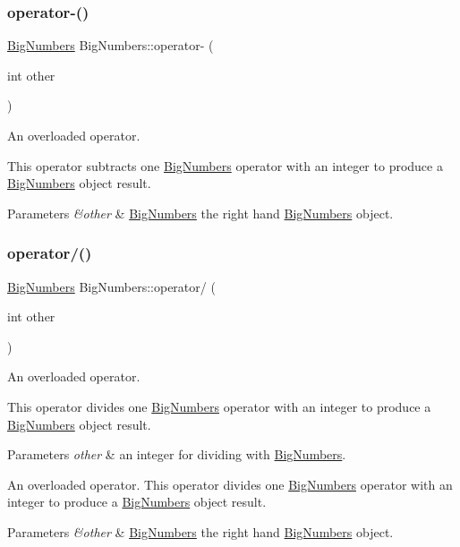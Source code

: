 \subsubsection{\texorpdfstring{operator-\/()}{operator-()}\hspace{0.1cm}{\footnotesize\ttfamily [2/2]}}
{\footnotesize\ttfamily \mbox{\hyperlink{class_big_numbers}{Big\+Numbers}} Big\+Numbers\+::operator-\/ (\begin{DoxyParamCaption}\item[{int}]{other }\end{DoxyParamCaption})}



An overloaded operator. 

This operator subtracts one \mbox{\hyperlink{class_big_numbers}{Big\+Numbers}} operator with an integer to produce a \mbox{\hyperlink{class_big_numbers}{Big\+Numbers}} object result. 
\begin{DoxyParams}{Parameters}
{\em \&other} & \mbox{\hyperlink{class_big_numbers}{Big\+Numbers}} the right hand \mbox{\hyperlink{class_big_numbers}{Big\+Numbers}} object. \\
\hline
\end{DoxyParams}
\mbox{\label{class_big_numbers_a81092d96f7775984c5e6ab79c603b8c2}} 
\subsubsection{\texorpdfstring{operator/()}{operator/()}}
{\footnotesize\ttfamily \mbox{\hyperlink{class_big_numbers}{Big\+Numbers}} Big\+Numbers\+::operator/ (\begin{DoxyParamCaption}\item[{int}]{other }\end{DoxyParamCaption})}



An overloaded operator. 

This operator divides one \mbox{\hyperlink{class_big_numbers}{Big\+Numbers}} operator with an integer to produce a \mbox{\hyperlink{class_big_numbers}{Big\+Numbers}} object result. 
\begin{DoxyParams}{Parameters}
{\em other} & an integer for dividing with \mbox{\hyperlink{class_big_numbers}{Big\+Numbers}}.\\
\hline
\end{DoxyParams}
An overloaded operator. This operator divides one \mbox{\hyperlink{class_big_numbers}{Big\+Numbers}} operator with an integer to produce a \mbox{\hyperlink{class_big_numbers}{Big\+Numbers}} object result. 
\begin{DoxyParams}{Parameters}
{\em \&other} & \mbox{\hyperlink{class_big_numbers}{Big\+Numbers}} the right hand \mbox{\hyperlink{class_big_numbers}{Big\+Numbers}} object. \\
\hline
\end{DoxyParams}
\mbox{\label{class_big_numbers_acc7490767828ba1addc49d07a5be3757}} 
